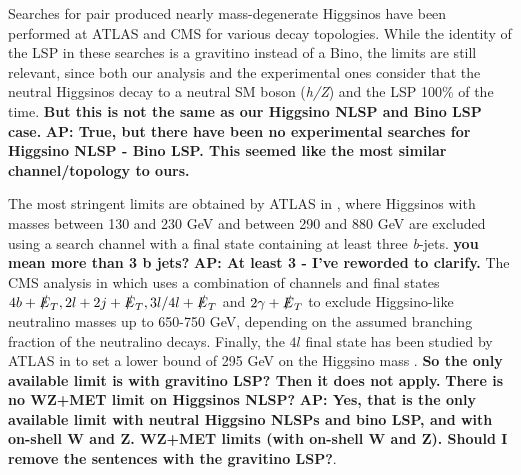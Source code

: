 \documentclass[a4paper,11pt]{article}
\newcommand{\Shufang}[1]{{\bf\color{Maroon}  #1}}
\newcommand{\Adarsh}[1]{{\bf\color{RoyalBlue} AP: #1}}
\begin{document}
Searches for pair produced nearly mass-degenerate Higgsinos  have been
performed at ATLAS and CMS for various decay  topologies. While the identity of
the LSP in these searches is a gravitino  instead of a Bino,   the limits are
still  relevant, since both  our analysis  and the experimental ones consider
that  the neutral Higgsinos decay to a  neutral SM boson (\emph{h/Z})  and the
LSP 100\% of the time.  \Shufang{But this is not the same as our Higgsino NLSP
  and Bino LSP case.} \Adarsh{True, but there have been no experimental
  searches for Higgsino NLSP - Bino LSP. This seemed like the most similar
channel/topology to ours.}

The most stringent limits are obtained by ATLAS in \cite{Aaboud:2018htj},
where Higgsinos with masses between 130 and 230 GeV and between 290 and 880 
GeV are excluded using a search channel with a final state containing at least
three \emph{b}-jets. \Shufang{you mean more than 3 b jets?} \Adarsh{At least 3 -
I've reworded to clarify.} The CMS analysis
in \cite{Sirunyan:2017ubx} which uses a combination of channels and final states 
$4b+\slashed{E}_T, 2l + 2j + \slashed{E}_T, 3l/4l + \slashed{E}_T$ and $2\gamma+\slashed{E}_T$ 
to exclude Higgsino-like neutralino masses up to 650-750 GeV, depending on the assumed branching 
fraction of the neutralino decays. Finally, the $4l$ final state has been studied by ATLAS in \cite{Aaboud:2018zeb}
to set a lower bound of 295 GeV on the Higgsino mass  \cite{Aaboud:2018zeb}.
\Shufang{So the only available limit is with gravitino LSP?  Then it does not apply.}
\Shufang{There is no  WZ+MET limit on Higgsinos NLSP?} \Adarsh{Yes, that is the
only available limit with neutral Higgsino NLSPs and bino LSP, and with
on-shell W and Z. WZ+MET limits (with on-shell W and Z). Should I remove the
sentences with the gravitino LSP?}.



\end{document}
